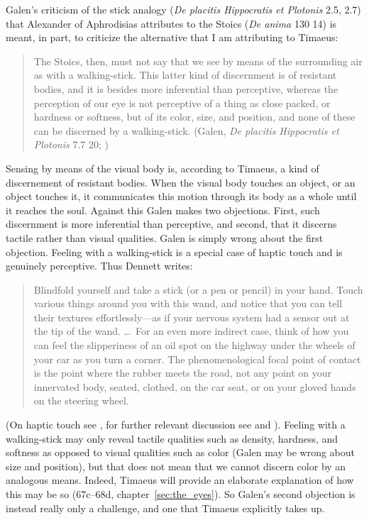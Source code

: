 Galen's criticism of the stick analogy (\emph{De placitis Hippocratis et Plotonis} 2.5, 2.7) that Alexander of Aphrodisias attributes to the Stoics (\emph{De anima} 130 14) is meant, in part, to criticize the alternative that I am attributing to Timaeus:
\begin{quote}
	The Stoics, then, must not say that we see by means of the surrounding air as with a walking-stick. This latter kind of discernment is of resistant bodies, and it is besides more inferential than perceptive, whereas the perception of our eye is not perceptive of a thing as close packed, or hardness or softness, but of its color, size, and position, and none of these can be discerned by a walking-stick. (Galen, \emph{De placitis Hippocratis et Plotonis} 7.7 20; \citealt[475]{Lacy:1980mk})
\end{quote}
Sensing by means of the visual body is, according to Timaeus, a kind of discernement of resistant bodies. When the visual body touches an object, or an object touches it, it communicates this motion through its body as a whole until it reaches the soul. Against this Galen makes two objections. First, such discernment is more inferential than perceptive, and second, that it discerns tactile rather than visual qualities. Galen is simply wrong about the first objection. Feeling with a walking-stick is a special case of haptic touch and is genuinely perceptive. Thus Dennett writes:
\begin{quote}
	Blindfold yourself and take a stick (or a pen or pencil) in your hand. Touch various things around you with this wand, and notice that you can tell their textures effortlessly---as if your nervous system had a sensor out at the tip of the wand. \ldots\ For an even more indirect case, think of how you can feel the slipperiness of an oil spot on the highway under the wheels of your car as you turn a corner. The phenomenological focal point of contact is the point where the rubber meets the road, not any point on your innervated body, seated, clothed, on the car seat, or on your gloved hands on the steering wheel. \citep[47]{Dennett:1993ce}
\end{quote}
(On haptic touch see \citealt{Lederman:1987fr}, for further relevant discussion see \citealt{Fulkerson:2014ek} and \citealt[chapters 1--2]{Kalderon:2018oe}). Feeling with a walking-stick may only reveal tactile qualities such as density, hardness, and softness as opposed to visual qualities such as color (Galen may be wrong about size and position), but that does not mean that we cannot discern color by an analogous means. Indeed, Timaeus will provide an elaborate explanation of how this may be so (67c–68d, chapter~\ref{sec:the_eyes}). So Galen's second objection is instead really only a challenge, and one that Timaeus explicitly takes up.

